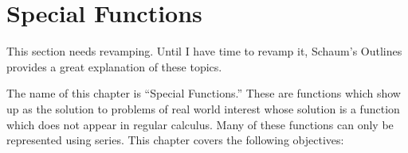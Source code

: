 
\chapter{Special Functions}

{This section needs revamping.  Until I have time to revamp it, Schaum's Outlines provides a great explanation of these topics. }


\noindent The name of this chapter is ``Special Functions.'' These are functions which show up as the solution to problems of real world interest whose solution is a function which does not appear in regular calculus.  Many of these functions can only be represented using series. This chapter covers the following objectives:



